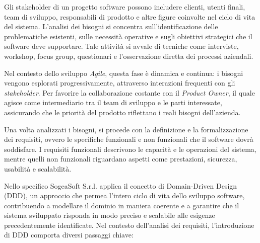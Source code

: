         \noindent Gli stakeholder di un progetto software possono includere clienti, utenti finali, team di sviluppo, responsabili di prodotto e altre figure coinvolte nel ciclo di vita del sistema. L’analisi dei bisogni si concentra sull’identificazione delle problematiche esistenti, sulle necessità operative e sugli obiettivi strategici che il software deve supportare. Tale attività si avvale di tecniche come interviste, workshop, focus group, questionari e l’osservazione diretta dei processi aziendali.

        Nel contesto dello sviluppo \textit{Agile}, questa fase è dinamica e continua: i bisogni vengono esplorati progressivamente, attraverso interazioni frequenti con gli \textit{stakeholder}. Per favorire la collaborazione costante con il \textit{Product Owner}, il quale agisce come intermediario tra il team di sviluppo e le parti interessate, assicurando che le priorità del prodotto riflettano i reali bisogni dell’azienda.

        Una volta analizzati i bisogni, si procede con la definizione e la formalizzazione dei requisiti, ovvero le specifiche funzionali e non funzionali che il software dovrà soddisfare. I requisiti funzionali descrivono le capacità e le operazioni del sistema, mentre quelli non funzionali riguardano aspetti come prestazioni, sicurezza, usabilità e scalabilità.

        Nello specifico SogeaSoft S.r.l. applica il concetto di Domain-Driven Design (DDD), un approccio che permea l’intero ciclo di vita dello sviluppo software, contribuendo a modellare il dominio in maniera coerente e a garantire che il sistema sviluppato risponda in modo preciso e scalabile alle esigenze precedentemente identificate.
        Nel contesto dell'analisi dei requisiti, l'introduzione di DDD comporta diversi passaggi chiave:

